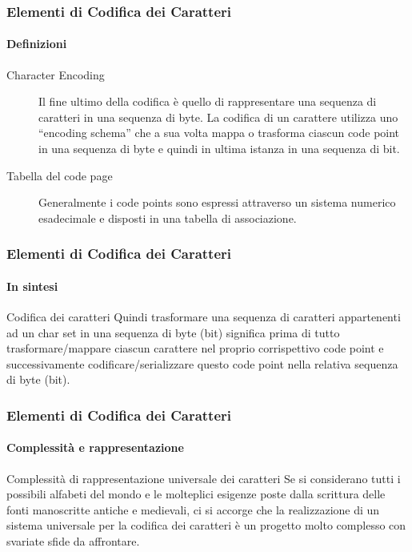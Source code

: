 \begin{frame}
	\frametitle{Elementi di Codifica dei Caratteri}
	\framesubtitle{Definizioni}
	\addtocounter{nframe}{1}


	\begin{description}
		\item [Character Encoding]  Il fine ultimo della codifica è quello di rappresentare una sequenza di caratteri in una sequenza di byte. La codifica di un carattere utilizza uno ``encoding schema'' che a sua volta mappa o trasforma ciascun code point in una sequenza di byte e quindi in ultima istanza in una sequenza di bit. 
		\item [Tabella del code page] Generalmente i code points sono espressi attraverso un sistema numerico esadecimale e disposti in una tabella di associazione.
	\end{description}

\end{frame}

\begin{frame}
	\frametitle{Elementi di Codifica dei Caratteri}
	\framesubtitle{In sintesi}
	\addtocounter{nframe}{1}


	\begin{block}{Codifica dei caratteri}
		Quindi trasformare una sequenza di caratteri appartenenti ad un char set in una sequenza di byte (bit) significa prima di tutto trasformare/mappare ciascun carattere nel proprio corrispettivo code point e successivamente codificare/serializzare questo code point nella relativa sequenza di byte (bit).
	\end{block}

\end{frame}


\begin{frame}
	\frametitle{Elementi di Codifica dei Caratteri}
	\framesubtitle{Complessità e rappresentazione}
	\addtocounter{nframe}{1}

	\begin{block}{Complessità di rappresentazione universale dei caratteri}
		Se si considerano tutti i possibili alfabeti del mondo e le molteplici esigenze poste dalla scrittura delle fonti manoscritte antiche e medievali, ci si accorge che la realizzazione di un sistema universale per la codifica dei caratteri è un progetto molto complesso con svariate sfide da affrontare.
	\end{block}

\end{frame}

